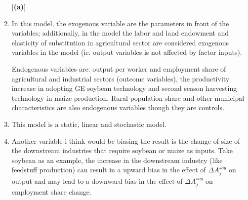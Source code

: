 \documentclass[letterpaper,12pt]{article}
\theoremstyle{definition}
\numberwithin{equation}{section}
\begin{document}
\begin{enumerate}  [\bfseries (a)]
	\item In this model, the exogenous variable are the parameters in front of the variables; additionally, in the model the labor and land endowment and elasticity of substitution in agricultural sector are considered exogenous variables in the model (ie. output variables is not affected by factor inputs).\par
	Endogenous variables are: output per worker and employment share of agricultural and industrial sectors (outcome variables), the productivity increase in adopting GE soybean technology and second season harvesting technology in maize production. Rural population share and other municipal characteristics are also endogenous variables though they are controls. \par
	\item This model is a static, linear and stochastic model. \par
	
	\item Another variable i think would be biasing the result is the change of size of the downstream industries that require soybean or maize as inputs. Take soybean as an example, the increase in the downstream industry (like feedstuff production) can result in a upward bias in the effect of \(\Delta A_j ^{soy}\) on output and may lead to a downward bias in the effect of \(\Delta A_j ^{soy}\) on employment share change.\par
	
\end{enumerate}
\end{document}

